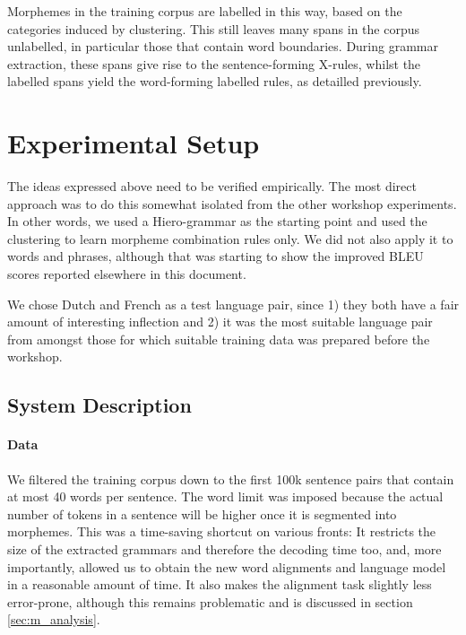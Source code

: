 Morphemes in the training corpus are labelled in this way, based on the categories induced by clustering.
This still leaves many spans in the corpus unlabelled, in particular those that contain word boundaries.
During grammar extraction, these spans give rise to the sentence-forming X-rules, whilst the labelled spans yield the word-forming labelled rules, as detailled previously.

\section{Experimental Setup}
The ideas expressed above need to be verified empirically.
The most direct approach was to do this somewhat isolated from the other workshop experiments.
In other words, we used a Hiero-grammar as the starting point and used the clustering to learn morpheme combination rules only.
We did not also apply it to words and phrases, although that was starting to show the improved BLEU scores reported elsewhere in this document.

We chose Dutch and French as a test language pair, since 1) they both have a fair amount of interesting inflection and 2) it was the most suitable language pair from amongst those for which suitable training data was prepared before the workshop.

\subsection{System Description}

\paragraph{Data}
We filtered the training corpus down to the first 100k sentence pairs that contain at most 40 words per sentence.
The word limit was imposed because the actual number of tokens in a sentence will be higher once it is segmented into morphemes.
This was a time-saving shortcut on various fronts: It restricts the size of the extracted grammars and therefore the decoding time too, and, more importantly, allowed us to obtain the new word alignments and language model in a reasonable amount of time.
It also makes the alignment task slightly less error-prone, although this remains problematic and is discussed in section \ref{sec:m_analysis}.

